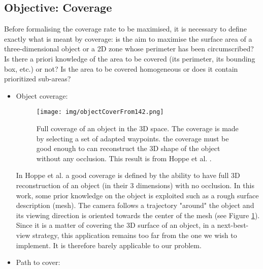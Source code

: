 \subsection{Objective: Coverage }\label{sec:FirstObjCover}

Before formalising the coverage rate to be maximised, it is necessary to define exactly what is meant by coverage: is the aim to maximise the surface area of a three-dimensional object or a 2D zone whose perimeter has been circumscribed? Is there a priori knowledge of the area to be covered (its perimeter, its bounding box, etc.) or not? Is the area to be covered homogeneous or does it contain prioritized sub-areas? 


\begin{itemize}
\item Object coverage: \\
\begin{figure}[t!]
\center
{}
   \texttt{[image: img/objectCoverFrom142.png]}
  \caption{Full coverage of an object in the 3D space. The coverage is made by selecting a set of adapted waypoints. the coverage must be good enough to can reconstruct the 3D shape of the object without any occlusion. This result is from Hoppe et al. \cite{142*hoppe2012}.}\label{fig:ObjectCover142}
  \endminipage\hfill
\end{figure}
   In Hoppe et al. \cite{142*hoppe2012} a good coverage is defined by the ability to have full 3D reconstruction of an object (in their 3 dimensions) with no occlusion. In this work, some prior knowledge on the object is exploited such as a rough surface description (mesh). The camera follows a trajectory "around" the object and its viewing direction is oriented towards the center of the mesh (see Figure \ref{fig:ObjectCover142}). 
  Since it is a matter of covering the 3D surface of an object, in a next-best-view strategy, this application remains too far from the one we wish to implement.  It is therefore barely applicable to our problem. \\ 
   \item Path to cover: \\
   \begin{figure}[t!]
\center
{}

\end{figure}
\end{itemize}
